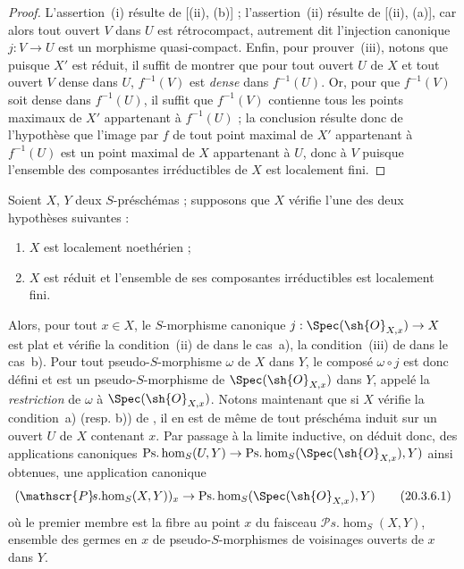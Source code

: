 \begin{proof}
L'assertion~(i) résulte de [(ii), (b)] ; l'assertion~(ii) résulte de [(ii), (a)], car alors tout ouvert $V$ dans $U$ est rétrocompact, autrement dit l'injection canonique $j:V\to U$ est un morphisme quasi-compact.
Enfin, pour prouver~(iii), notons que puisque $X'$ est réduit, il suffit de montrer que pour tout ouvert $U$ de $X$ et tout ouvert $V$ dense dans $U$, $f^{-1}(V)$ est \emph{dense} dans $f^{-1}(U)$.
Or, pour que $f^{-1}(V)$ soit dense dans $f^{-1}(U)$, il suffit que $f^{-1}(V)$ contienne tous les points maximaux de $X'$ appartenant à $f^{-1}(U)$ ; la conclusion résulte donc de l'hypothèse que l'image par $f$ de tout point
maximal de $X'$ appartenant à $f^{-1}(U)$ est un point maximal de $X$ appartenant à $U$, donc à $V$ puisque l'ensemble des composantes irréductibles de $X$ est localement fini.
\end{proof}

\begin{env}[20.3.6]
Soient $X$, $Y$ deux $S$-préschémas ; supposons que $X$ vérifie l'une des deux hypothèses suivantes :
\begin{enumerate}[label=\emph{\alph*)}]
  \item $X$ est localement noethérien ;
  \item $X$ est réduit et l'ensemble de ses composantes irréductibles est localement fini.
\end{enumerate}
Alors, pour tout $x\in X$, le $S$-morphisme canonique $j:\Spec(\sh{O}_{X,x})\to X$ est plat et vérifie la condition~(ii) de  dans le cas~a), la condition~(iii) de  dans le cas~b).
Pour tout pseudo-$S$-morphisme $\omega$ de $X$ dans $Y$, le composé $\omega\circ j$ est donc défini et est un pseudo-$S$-morphisme de $\Spec(\sh{O}_{X,x})$ dans $Y$, appelé la \emph{restriction} de $\omega$ à $\Spec(\sh{O}_{X,x})$.
Notons maintenant que si $X$ vérifie la condition~a) (resp. b)) de , il en est de même de tout préschéma induit sur un ouvert $U$ de $X$ contenant $x$.
Par passage à la limite inductive, on déduit donc, des applications canoniques $\operatorname{Ps.hom}_S(U,Y)\to\operatorname{Ps.hom}_S(\Spec(\sh{O}_{X,x}),Y)$ ainsi obtenues, une application canonique
\[
\label{IV.20.3.6.1}
  (\mathscr{P}\!s.\!\operatorname{hom}_S(X,Y))_x\to\operatorname{Ps.hom}_S(\Spec(\sh{O}_{X,x}),Y)
  \tag{20.3.6.1}
\]
où le premier membre est la fibre au point $x$ du faisceau $\mathscr{P}\!s.\!\operatorname{hom}_S(X,Y)$, ensemble des germes en $x$ de pseudo-$S$-morphismes de voisinages ouverts de $x$ dans $Y$.
\end{env}

